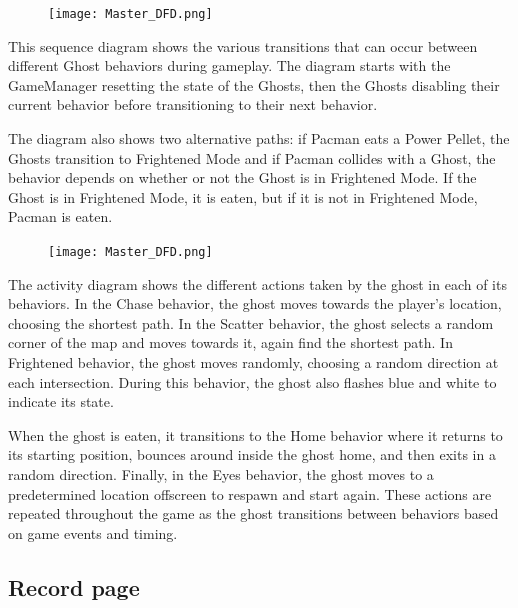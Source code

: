 \documentclass[11pt]{article}
\begin{document}
\begin{figure}[H]
    \centering
    \texttt{[image: Master\_DFD.png]}
\end{figure}

This sequence diagram shows the various transitions that can occur between different Ghost behaviors during gameplay. The diagram starts with the GameManager resetting the state of the Ghosts, then the Ghosts disabling their current behavior before transitioning to their next behavior.

The diagram also shows two alternative paths: if Pacman eats a Power Pellet, the Ghosts transition to Frightened Mode and if Pacman collides with a Ghost, the behavior depends on whether or not the Ghost is in Frightened Mode. If the Ghost is in Frightened Mode, it is eaten, but if it is not in Frightened Mode, Pacman is eaten.

\begin{figure}[H]
    \centering
    \texttt{[image: Master\_DFD.png]}
\end{figure}

The activity diagram shows the different actions taken by the ghost in each of its behaviors. In the Chase behavior, the ghost moves towards the player's location, choosing the shortest path. In the Scatter behavior, the ghost selects a random corner of the map and moves towards it, again find the shortest path. In Frightened behavior, the ghost moves randomly, choosing a random direction at each intersection. During this behavior, the ghost also flashes blue and white to indicate its state.

When the ghost is eaten, it transitions to the Home behavior where it returns to its starting position, bounces around inside the ghost home, and then exits in a random direction. Finally, in the Eyes behavior, the ghost moves to a predetermined location offscreen to respawn and start again. These actions are repeated throughout the game as the ghost transitions between behaviors based on game events and timing.

\subsection{Record page}
\end{document}
